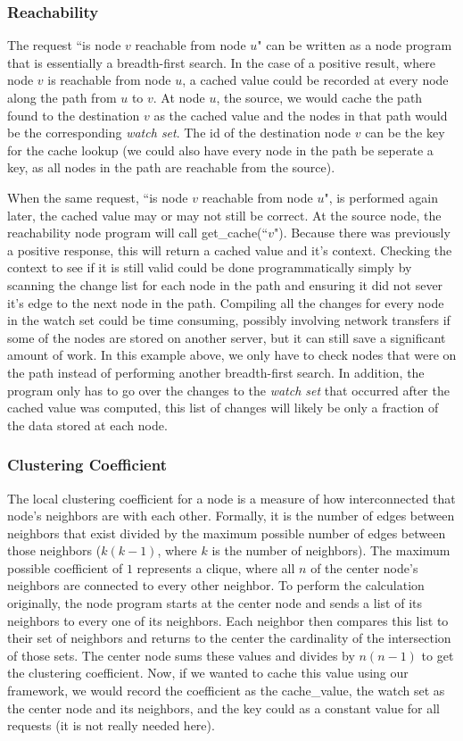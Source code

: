 \documentclass[letterpaper,twocolumn,11pt,tight]{article}
\begin{document}
\subsubsection{Reachability}
The request ``is node $v$ reachable from node $u$" can be written as a node program that is essentially a breadth-first search. In the case of a positive result, where node $v$ is reachable from node $u$, a cached value could be recorded at every node along the path from $u$ to $v$. At node $u$, the source, we would cache the path found to the destination $v$ as the cached value and the nodes in that path would be the corresponding \emph{watch set}. The id of the destination node $v$ can be the key for the cache lookup (we could also have every node in the path be seperate a key, as all nodes in the path are reachable from the source). 

    When the same request, ``is node $v$ reachable from node $u$", is performed again later, the cached value may or may not still be correct. At the source node, the reachability node program will call get\_cache(``$v$"). Because there was previously a positive response, this will return a cached value and it's context. Checking the context to see if it is still valid could be done programmatically simply by scanning the change list for each node in the path and ensuring it did not sever it's edge to the next node in the path.
    Compiling all the changes for every node in the watch set could be time consuming, possibly involving network transfers if some of the nodes are stored on another server, but it can still save a significant amount of work. In this example above, we only have to check nodes that were on the path instead of performing another breadth-first search. In addition, the program only has to go over the changes to the \emph{watch set} that occurred after the cached value was computed, this list of changes will likely be only a fraction of the data stored at each node.

\subsubsection{Clustering Coefficient}\label{sec:clustering}
The local clustering coefficient for a node is a measure of how interconnected that node's neighbors are with each other. Formally, it is the number of edges between neighbors that exist divided by the maximum possible number of edges between those neighbors ($k(k-1)$, where $k$ is the number of neighbors).
The maximum possible coefficient of $1$ represents a clique, where all $n$ of the center node's neighbors are connected to every other neighbor.
To perform the calculation originally, the node program starts at the center node and sends a list of its neighbors to every one of its neighbors.
Each neighbor then compares this list to their set of neighbors and returns to the center the cardinality of the intersection of those sets.
The center node sums these values and divides by $n(n-1)$ to get the clustering coefficient. Now, if we wanted to cache this value using our framework, we would record the coefficient as the cache\_value, the watch set as the center node and its neighbors, and the key could as a constant value for all requests (it is not really needed here).
\end{document}
